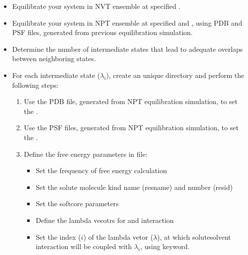 \documentclass[letterpaper,10pt,english]{sphinxmanual}
\begin{document}
\begin{enumerate}
\begin{itemize}
\item {} 
\sphinxAtStartPar
Equilibrate your system in NVT ensemble at specified .

\item {} 
\sphinxAtStartPar
Equilibrate your system in NPT ensemble at specified  and , using
PDB and PSF  files, generated from previous equilibration simulation.

\item {} 
\sphinxAtStartPar
Determine the number of intermediate states that lead to adequate overlaps between
neighboring states.

\item {} 
\sphinxAtStartPar
For each intermediate state (\(\lambda_i\)), create an unique directory and perform the following steps:
\begin{enumerate}
%
\item {} 
\sphinxAtStartPar
Use the  PDB file, generated from NPT equilibration simulation, to set the .

\item {} 
\sphinxAtStartPar
Use the  PSF files, generated from NPT equilibration simulation, to set the .

\item {} 
\sphinxAtStartPar
Define the free energy parameters in  file:
\begin{itemize}
\item {} 
\sphinxAtStartPar
Set the frequency of free energy calculation

\item {} 
\sphinxAtStartPar
Set the solute molecule kind name (resname) and number (resid)

\item {} 
\sphinxAtStartPar
Set the soft\sphinxhyphen{}core parameters

\item {} 
\sphinxAtStartPar
Define the lambda vecotrs for  and  interaction

\item {} 
\sphinxAtStartPar
Set the index (\(i\)) of the lambda vetor (\(\lambda\)), at which solute\sphinxhyphen{}solvent interaction
will be coupled with \(\lambda_i\), using  keyword.


\end{itemize}
\end{enumerate}
\end{itemize}
\end{enumerate}
\end{document}

